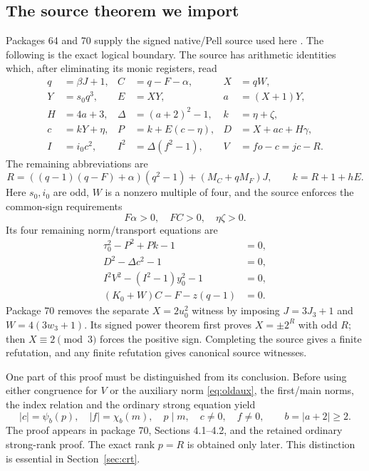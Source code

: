 \documentclass[11pt]{article}
\theoremstyle{remark}\newtheorem{remark}[theorem]{Remark}
\begin{document}
\subsection{The source theorem we import}
Packages 64 and 70 supply the signed native/Pell source used here
\cite{source64,source70}. The following is the exact logical boundary.
The source has arithmetic identities which, after eliminating its
monic registers, read
\begin{align*}
 q&=\beta J+1,& C&=q-F-\alpha,& X&=qW,\\
 Y&=s_0q^3,& E&=XY,& a&=(X+1)Y,\\
 H&=4a+3,&\Delta&=(a+2)^2-1,& k&=\eta+\zeta,\\
 c&=kY+\eta,& P&=k+E(c-\eta),&D&=X+ac+H\gamma,\\
 I&=i_0c^2,& I^2&=\Delta(f^2-1),&
 V&=fo-c=jc-R.
\end{align*}
The remaining abbreviations are
\[
 R=((q-1)(q-F)+\alpha)(q^2-1)+(M_C+qM_F)J,
 \qquad k=R+1+hE.
\]
Here $s_0,i_0$ are odd, $W$ is a nonzero multiple of four, and the
source enforces the common-sign requirements
\[
 F\alpha>0,\quad FC>0,\quad\eta\zeta>0.
\]
Its four remaining norm/transport equations are
\begin{align}
 \tau_0^2-P^2+Pk-1&=0,                         \label{eq:oldfirst}\\
 D^2-\Delta c^2-1&=0,                         \label{eq:oldmain}\\
 I^2V^2-(I^2-1)y_0^2-1&=0,                   \label{eq:oldaux}\\
 (K_0+W)C-F-z(q-1)&=0.                        \label{eq:oldtransport}
\end{align}
Package 70 removes the separate $X=2u_0^2$ witness by imposing
$J=3J_3+1$ and $W=4(3w_3+1)$. Its signed power theorem first proves
$X=\pm2^R$ with odd $R$; then $X\equiv2\pmod3$ forces the positive
sign. Completing the source gives a finite refutation, and any finite
refutation gives canonical source witnesses.

One part of this proof must be distinguished from its conclusion. Before
using either congruence for $V$ or the auxiliary norm
\eqref{eq:oldaux}, the first/main norms, the index relation and the
ordinary strong equation yield
\begin{equation}
 |c|=\psi_b(p),\quad |f|=\chi_b(m),\quad
 p\mid m,\quad c\ne0,\quad f\ne0,
 \qquad b=|a+2|\ge2.                         \label{eq:earlyrank}
\end{equation}
The proof appears in package 70, Sections 4.1--4.2, and the retained
ordinary strong-rank proof. The exact rank $p=R$ is obtained only later.
This distinction is essential in Section~\ref{sec:crt}.
\end{document}
